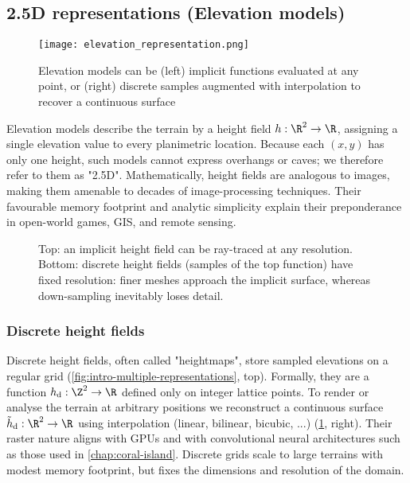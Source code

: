 \subsection{2.5D representations (Elevation models)}

\begin{figure}
  \texttt{[image: elevation\_representation.png]}
  \caption[Implicit and discrete elevation models]{Elevation models can be (left) implicit functions evaluated at any point, or (right) discrete samples augmented with interpolation to recover a continuous surface \cite{Galin2019}}
  \label{fig:erosion-elevation-representation}
\end{figure}

Elevation models describe the terrain by a height field $h: \R^{2}  \to  \R$, assigning a single elevation value to every planimetric location. Because each $(x,y)$ has only one height, such models cannot express overhangs or caves; we therefore refer to them as "2.5D". Mathematically, height fields are analogous to images, making them amenable to decades of image-processing techniques. Their favourable memory footprint and analytic simplicity explain their preponderance in open-world games, GIS, and remote sensing.

\begin{figure}
    \caption[Comparison of an implicit representation with discrete representations at different resolutions]{Top: an implicit height field can be ray-traced at any resolution. Bottom: discrete height fields (samples of the top
    function) have fixed resolution: finer meshes approach the implicit surface, whereas down-sampling inevitably loses detail.}
    \label{fig:sota-representations-heights-resolutions}
\end{figure}


\subsubsection{Discrete height fields}
Discrete height fields, often called "heightmaps", store sampled elevations on a regular grid (\cref{fig:intro-multiple-representations}, top). Formally, they are a function $h_{ \text{d}}: \Z^{2} \to \R$ defined only on integer lattice points. To render or analyse the terrain at arbitrary positions we reconstruct a continuous surface $ \tilde{h}_{ \text{d}}: \R^{2} \to \R$ using interpolation (linear, bilinear, bicubic, ...) (\cref{fig:erosion-elevation-representation}, right). Their raster nature aligns with GPUs and with convolutional neural architectures such as those used in \cref{chap:coral-island}. Discrete grids scale to large terrains with modest memory footprint, but fixes the dimensions and resolution of the domain.

